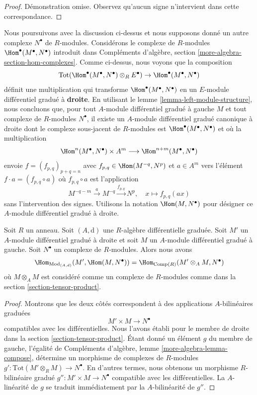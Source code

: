 \begin{proof}
Démonstration omise. Observez qu'aucun signe n'intervient dans cette correspondance.
\end{proof}

\noindent
Nous poursuivons avec la discussion ci-dessus et nous supposons donné un
autre complexe $N^\bullet$ de $R$-modules. Considérons le complexe
de $R$-modules $\Hom^\bullet(M^\bullet, N^\bullet)$ introduit dans
Compléments d'algèbre, section \ref{more-algebra-section-hom-complexes}. Comme
ci-dessus, nous voyons que la composition
$$
\text{Tot}(\Hom^\bullet(M^\bullet, N^\bullet) \otimes_R E^\bullet)
\to \Hom^\bullet(M^\bullet, N^\bullet)
$$
définit une multiplication qui transforme $\Hom^\bullet(M^\bullet, N^\bullet)$
en un $E$-module différentiel gradué à {\bf droite}. En utilisant
le lemme \ref{lemma-left-module-structure},
nous concluons que, pour tout $A$-module différentiel gradué à gauche $M$
et tout complexe de $R$-modules $N^\bullet$, il existe un
$A$-module différentiel gradué canonique à droite dont le complexe
sous-jacent de $R$-modules est $\Hom^\bullet(M^\bullet, N^\bullet)$ et où
la multiplication
$$
\Hom^n(M^\bullet, N^\bullet) \times A^m \longrightarrow
\Hom^{n + m}(M^\bullet, N^\bullet)
$$
envoie $f = (f_{p, q})_{p + q = n}$ avec $f_{p, q} \in \Hom(M^{-q}, N^p)$
et $a \in A^m$ vers l'élément $f \cdot a = (f_{p, q} \circ a)$ où $f_{p,
q} \circ a$ est l'application
$$
M^{-q - m} \xrightarrow{a} M^{-q} \xrightarrow{f_{p, q}} N^p, \quad
x \longmapsto f_{p, q}(ax)
$$
sans l'intervention des signes. Utilisons la notation
$\Hom(M, N^\bullet)$ pour désigner ce $A$-module différentiel gradué à droite.

\begin{lemma}
\label{lemma-characterize-hom}
Soit $R$ un anneau. Soit $(A, \text{d})$ une $R$-algèbre différentielle graduée.
Soit $M'$ un $A$-module différentiel gradué à droite et soit
$M$ un $A$-module différentiel gradué à gauche.
Soit $N^\bullet$ un complexe de $R$-modules. Alors nous avons
$$
\Hom_{\text{Mod}_{(A, d)}}(M', \Hom(M, N^\bullet)) =
\Hom_{\text{Comp}(R)}(M' \otimes_A M, N^\bullet)
$$
où $M \otimes_A M$ est considéré comme un complexe de $R$-modules
comme dans la section \ref{section-tensor-product}.
\end{lemma}

\begin{proof}
Montrons que les deux côtés correspondent à des applications $A$-bilinéaires graduées
$$
M' \times M \longrightarrow N^\bullet
$$
compatibles avec les différentielles. Nous l'avons établi pour le membre de
droite dans la section \ref{section-tensor-product}. Étant donné un élément
$g$ du membre de gauche, l'égalité de
Compléments d'algèbre, lemme \ref{more-algebra-lemma-compose}, détermine
un morphisme de complexes de $R$-modules $g' :
\text{Tot}(M' \otimes_R M) \to N^\bullet$. En d'autres
termes, nous obtenons un morphisme $R$-bilinéaire
gradué $g'' : M' \times M \to N^\bullet$ compatible avec les différentielles. La
$A$-linéarité de $g$ se traduit immédiatement par la
$A$-bilinéarité de $g''$.
\end{proof}

